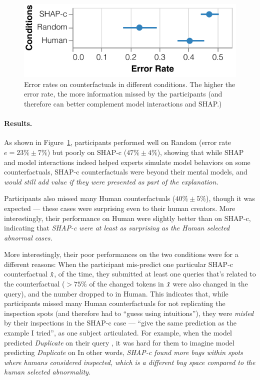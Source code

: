 \begin{figure}[t]
\centering
\includegraphics[width=1\columnwidth]{figures/exp_err_rate}
\vspace{-15pt}
\caption{
Error rates on counterfactuals in different conditions. The higher the error rate, the more information missed by the participants (\ie and therefore can better complement model interactions and SHAP.)
}
\vspace{-10pt}
\label{fig:err_rate}
\end{figure}

\paragraph{Results.}
As shown in Figure~\ref{fig:err_rate}, participants performed well on Random (error rate $e=23\%\pm7\%$) but poorly on SHAP-c ($47\%\pm 4\%$), showing that while SHAP and model interactions indeed helped experts simulate model behaviors on some counterfactuals, SHAP-c counterfactuals were beyond their mental models, and \emph{would still add value if they were presented as part of the explanation.}

Participants also missed many Human counterfactuals ($40\%\pm 5\%$), though it was expected --- these cases were surprising even to their human creators.
More interestingly, their performance on Human were slightly better than on SHAP-c, indicating that \emph{SHAP-c were at least as surprising as the Human selected abnormal cases.}

More interestingly, their poor performances on the two conditions were for a different reasons: 
When the participant mis-predict one particular SHAP-c counterfactual $\hat{x}$,  of the time, they submitted at least one queries that's related to the counterfactual (\ie $>75\%$ of the changed tokens in $\hat{x}$ were also changed in the query), and the number dropped to  in Human.
This indicates that, while participants missed many Human counterfactuals for not replicating the inspection spots (and therefore had to ``guess using intuitions''), they were \emph{misled} by their inspections in the SHAP-c case --- ``give the same prediction as the example I tried'', as one subject articulated.
For example, when the model predicted \emph{Duplicate} on their query , it was hard for them to imagine model predicting \emph{Duplicate} on  
In other words, \emph{SHAP-c found more bugs within spots where humans considered inspected, which is a different bug space compared to the human selected abnormality.}

